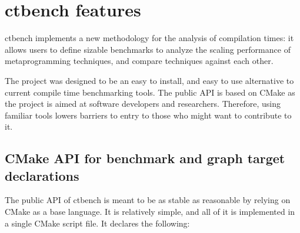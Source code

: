 \documentclass[../main]{subfiles}
\begin{document}
\section{
  ctbench features
}

ctbench implements a new methodology for the analysis of compilation times:
it allows users to define \cpp sizable benchmarks to analyze the scaling
performance of \cpp metaprogramming techniques, and compare techniques
against each other.

The project was designed to be an easy to install,
and easy to use alternative to current compile time benchmarking tools.
The public API is based on CMake as the project is aimed at \cpp software
developers and researchers. Therefore, using familiar tools
lowers barriers to entry to those who might want to contribute to it.



\subsection{
  CMake API for benchmark and graph target declarations
}
\label{lbl:ctbench-cmake-api}


The public API of ctbench is meant to be as stable as reasonable by relying on
CMake as a base language. It is relatively simple, and all of it is implemented
in a single CMake script file. It declares the following:

\end{document}
